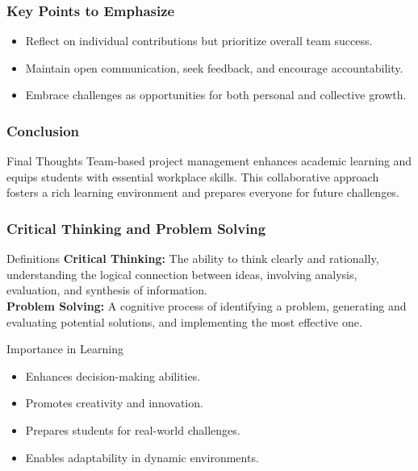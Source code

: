 \documentclass[aspectratio=169]{beamer}
\begin{document}
\begin{frame}[fragile]
    \frametitle{Key Points to Emphasize}
    \begin{itemize}
        \item Reflect on individual contributions but prioritize overall team success.
        \item Maintain open communication, seek feedback, and encourage accountability.
        \item Embrace challenges as opportunities for both personal and collective growth.
    \end{itemize}
\end{frame}

\begin{frame}[fragile]
    \frametitle{Conclusion}
    \begin{block}{Final Thoughts}
        Team-based project management enhances academic learning and equips students with essential workplace skills. This collaborative approach fosters a rich learning environment and prepares everyone for future challenges.
    \end{block}
\end{frame}

\begin{frame}[fragile]
    \frametitle{Critical Thinking and Problem Solving}

    \begin{block}{Definitions}
        \textbf{Critical Thinking:} The ability to think clearly and rationally, understanding the logical connection between ideas, involving analysis, evaluation, and synthesis of information.\\
        \textbf{Problem Solving:} A cognitive process of identifying a problem, generating and evaluating potential solutions, and implementing the most effective one.
    \end{block}
    
    \begin{block}{Importance in Learning}
        \begin{itemize}
            \item Enhances decision-making abilities.
            \item Promotes creativity and innovation.
            \item Prepares students for real-world challenges.
            \item Enables adaptability in dynamic environments.
        \end{itemize}
    \end{block}
\end{frame}
\end{document}
